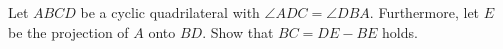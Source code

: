 Let $ABCD$ be a cyclic quadrilateral with $\angle ADC=\angle DBA$.
Furthermore, let $E$ be the projection of $A$ onto $BD$. Show that $BC=DE-BE$ holds.